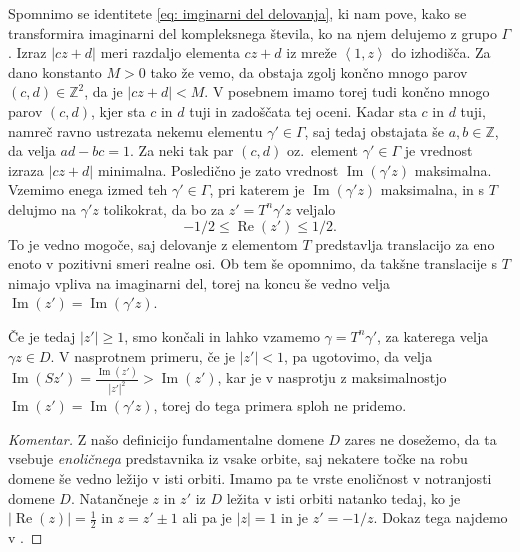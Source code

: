 \documentclass[mat1]{fmfdelo}
\numberwithin{equation}{section}
\newcommand{\Z}{\mathbb Z}
\newcommand{\SL}{\Gamma}
\newcommand{\abs}[1]{\left\lvert #1 \right\rvert}
\newcommand{\lattice}[2]{\left\langle #1, #2 \right\rangle}
\renewcommand\Re{\operatorname{Re}}%
\renewcommand\Im{\operatorname{Im}}%
\newcommand{\oz}{oz.\ }
\theoremstyle{definition}
\newenvironment{komentar}[1][Komentar]{\begin{proof}[#1]\let\qed\relax}{\end{proof}}
\begin{document}
\begin{dokaz}
    Spomnimo se identitete \eqref{eq: imginarni del delovanja}, ki nam pove, kako se transformira imaginarni del kompleksnega števila, ko na njem delujemo z grupo $\SL$. Izraz $\abs{cz + d}$ meri razdaljo elementa $cz + d$ iz mreže $\lattice{1}{z}$ do izhodišča. Za dano konstanto $M > 0$ tako že vemo, da obstaja zgolj končno mnogo parov $(c,d) \in \Z^2$, da je $\abs{cz + d} < M$. V posebnem imamo torej tudi končno mnogo parov $(c,d)$, kjer sta $c$ in $d$ tuji in zadoščata tej oceni. Kadar sta $c$ in $d$ tuji, namreč ravno ustrezata nekemu elementu $\gamma' \in \SL$, saj tedaj obstajata še $a,b \in \Z$, da velja $ad - bc = 1$. Za neki tak par $(c,d)$ \oz element $\gamma' \in \SL$ je vrednost izraza $\abs{cz + d}$ minimalna. Posledično je zato vrednost $\Im(\gamma' z)$ maksimalna.
    Vzemimo enega izmed teh $\gamma' \in \SL$, pri katerem je $\Im(\gamma'z)$ maksimalna, in s $T$ delujmo na $\gamma'z$ tolikokrat, da bo za $z' = T^n\gamma'z$ veljalo
    \[
        -1/2 \leq \Re(z') \leq 1/2.
    \]
    To je vedno mogoče, saj delovanje z elementom $T$ predstavlja translacijo za eno enoto v pozitivni smeri realne osi. Ob tem še opomnimo, da takšne translacije s $T$ nimajo vpliva na imaginarni del, torej na koncu še vedno velja $\Im(z') = \Im(\gamma'z)$. 

    Če je tedaj $\abs{z'} \geq 1$, smo končali in lahko vzamemo $\gamma = T^n\gamma'$, za katerega velja $\gamma z\in D$. V nasprotnem primeru, če je $\abs{z'} < 1$, pa ugotovimo, da velja $\Im(Sz') = \frac{\Im(z')}{\abs{z'}^2} > \Im(z')$,
    kar je v nasprotju z maksimalnostjo $\Im(z') = \Im(\gamma'z)$, torej do tega primera sploh ne pridemo.
\end{dokaz}


\begin{komentar}
    Z našo definicijo fundamentalne domene $D$ zares ne dosežemo, da ta vsebuje \emph{enoličnega} predstavnika iz vsake orbite, saj nekatere točke na robu domene še vedno ležijo v isti orbiti. Imamo pa te vrste enoličnost v notranjosti domene $D$.
    Natančneje $z$ in $z'$ iz $D$ ležita v isti orbiti natanko tedaj, ko je $\abs{\Re(z)} = \frac12$ in $z = z' \pm 1$ ali pa je $\abs{z} = 1$ in je $z' = -1/z$. Dokaz tega najdemo v \cite[VII, \S1, theorem 1]{Serre}.
\end{komentar}
\end{document}
